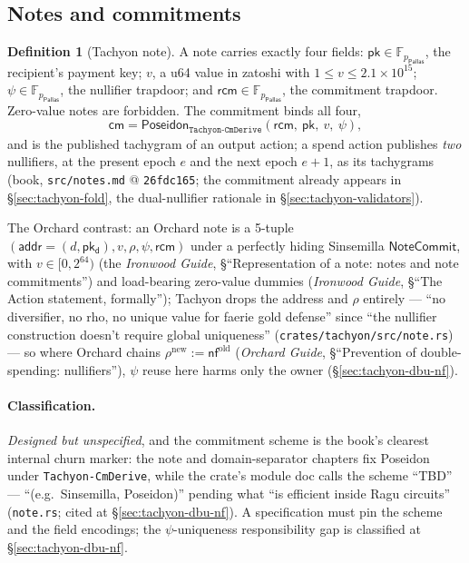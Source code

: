 \documentclass[11pt,a4paper]{article}
\theoremstyle{definition}
\newtheorem{definition}[theorem]{Definition}
\newcommand{\F}{\mathbb{F}}
\newcommand{\nfsym}{\mathsf{nf}}
\newcommand{\cmsym}{\mathsf{cm}}
\newcommand{\Pallas}{\ensuremath{\mathsf{Pallas}}}
\newcommand{\NoteCommit}{\ensuremath{\mathsf{NoteCommit}}}
\newcommand{\pkd}{\ensuremath{\mathsf{pk_d}}}
\newcommand{\rcm}{\ensuremath{\mathsf{rcm}}}
\begin{document}
\subsection{Notes and commitments}\label{sec:tachyon-design-notes}

\begin{definition}[Tachyon note]\label{def:tachyon-design-note}
A note carries exactly four fields: $\mathsf{pk} \in \F_{p_{\Pallas}}$, the
recipient's payment key; $v$, a u64 value in zatoshi with
$1 \leq v \leq 2.1 \times 10^{15}$; $\psi \in \F_{p_{\Pallas}}$, the
nullifier trapdoor; and $\rcm \in \F_{p_{\Pallas}}$, the commitment
trapdoor. Zero-value notes are forbidden. The commitment binds all four,
\[
\cmsym = \mathsf{Poseidon}_{\texttt{Tachyon-CmDerive}}
  (\rcm,\ \mathsf{pk},\ v,\ \psi),
\]
and is the published tachygram of an output action; a spend action
publishes \emph{two} nullifiers, at the present epoch $e$ and the next
epoch $e+1$, as its tachygrams (book, \texttt{src/notes.md} @
\texttt{26fdc165}; the commitment already appears in
\S\ref{sec:tachyon-fold}, the dual-nullifier rationale in
\S\ref{sec:tachyon-validators}).
\end{definition}

The Orchard contrast: an Orchard note is a 5-tuple
$(\mathsf{addr} = (d, \pkd), v, \rho, \psi, \rcm)$ under a perfectly
hiding Sinsemilla $\NoteCommit$, with $v \in [0, 2^{64})$ (the
\emph{Ironwood Guide}, \S``Representation of a note: notes and note
commitments'') and load-bearing zero-value dummies (\emph{Ironwood Guide},
\S``The Action statement, formally''); Tachyon drops the address and
$\rho$ entirely --- ``no diversifier, no rho, no unique value for faerie
gold defense'' since ``the nullifier construction doesn't require global
uniqueness'' (\texttt{crates/tachyon/src/note.rs}) --- so where Orchard
chains $\rho^{\mathrm{new}} := \nfsym^{\mathrm{old}}$ (\emph{Orchard
Guide}, \S``Prevention of double-spending: nullifiers''), $\psi$ reuse
here harms only the owner (\S\ref{sec:tachyon-dbu-nf}).

\paragraph{Classification.} \emph{Designed but unspecified}, and the
commitment scheme is the book's clearest internal churn marker: the note
and domain-separator chapters fix Poseidon under \texttt{Tachyon-CmDerive},
while the crate's module doc calls the scheme ``TBD'' --- ``(e.g.\
Sinsemilla, Poseidon)'' pending what ``is efficient inside Ragu circuits''
(\texttt{note.rs}; cited at \S\ref{sec:tachyon-dbu-nf}). A specification
must pin the scheme and the field encodings; the $\psi$-uniqueness
responsibility gap is classified at \S\ref{sec:tachyon-dbu-nf}.
\end{document}
